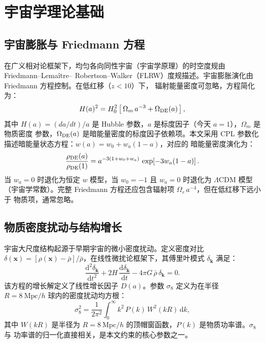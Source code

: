 \chapter{宇宙学理论基础}\label{chap:theory}

\section{宇宙膨胀与 Friedmann 方程}\label{sec:friedmann}

在广义相对论框架下，均匀各向同性宇宙（宇宙学原理）的时空度规由 Friedmann--Lema\^{i}tre--
Robertson--Walker（FLRW）度规描述。宇宙膨胀演化由 Friedmann 方程控制。在低红移（$z<10$）下，
辐射能量密度可忽略，方程简化为：
\begin{equation}\label{eq:friedmann}
  H(a)^2 = H_0^2 \left[\, \Omega_m\, a^{-3} + \Omega_{\rm DE}(a) \,\right],
\end{equation}
其中 $H(a)=(da/dt)/a$ 是 Hubble 参数，$a$ 是标度因子（今天 $a=1$），$\Omega_m$ 是物质密度
参数，$\Omega_{\rm DE}(a)$ 是暗能量密度的标度因子依赖项。本文采用 CPL
参数化\cite{Chevallier2001,Linder2003}描述暗能量状态方程：$w(a)=w_0+w_a(1-a)$，对应的
暗能量密度演化为：
\begin{equation}\label{eq:de-density}
  \frac{\rho_{\rm DE}(a)}{\rho_{\rm DE}(1)}
    = a^{-3(1+w_0+w_a)}\, \exp\!\left[-3 w_a (1-a)\right].
\end{equation}
当 $w_a=0$ 时退化为恒定 $w$ 模型，当 $w_0=-1$ 且 $w_a=0$ 时退化为 $\Lambda$CDM 模型
（宇宙学常数）。完整 Friedmann 方程还应包含辐射项 $\Omega_r\, a^{-4}$，但在低红移下远小于
物质项，通常忽略。

\section{物质密度扰动与结构增长}\label{sec:growth}

宇宙大尺度结构起源于早期宇宙的微小密度扰动。定义密度对比
$\delta(\symbf{x})=[\rho(\symbf{x})-\bar\rho]/\bar\rho$，在线性微扰论框架下，其傅里叶模式
$\delta_{\symbf{k}}$ 满足：
\begin{equation}\label{eq:linear-growth}
  \frac{\mathrm d^2 \delta_{\symbf{k}}}{\mathrm d t^2}
    + 2H \,\frac{\mathrm d \delta_{\symbf{k}}}{\mathrm d t}
    - 4\pi G\, \bar\rho\, \delta_{\symbf{k}} = 0.
\end{equation}
该方程的增长解定义了线性增长因子 $D(a)$。参数 $\sigma_8$ 定义为在半径 $R=8~\mathrm{Mpc}/h$
球内的密度扰动均方根：
\begin{equation}\label{eq:sigma8}
  \sigma_8^2 = \frac{1}{2\pi^2}
    \int_0^{\infty} k^2\, P(k)\, W^2(kR)\, \mathrm d k,
\end{equation}
其中 $W(kR)$ 是半径为 $R=8~\mathrm{Mpc}/h$ 的顶帽窗函数，$P(k)$ 是物质功率谱。$\sigma_8$ 与
功率谱的归一化直接相关，是本文约束的核心参数之一。

